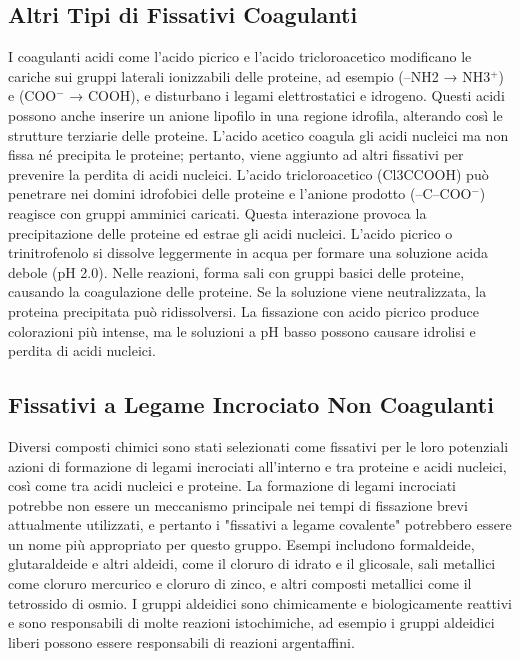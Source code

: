 \subsection{Altri Tipi di Fissativi Coagulanti}
I coagulanti acidi come l'acido picrico e l'acido tricloroacetico modificano le cariche sui gruppi laterali ionizzabili delle proteine, ad esempio (–NH2 → NH3\(^+\)) e (COO\(^{-}\) → COOH), e disturbano i legami elettrostatici e idrogeno. Questi acidi possono anche inserire un anione lipofilo in una regione idrofila, alterando così le strutture terziarie delle proteine. L'acido acetico coagula gli acidi nucleici ma non fissa né precipita le proteine; pertanto, viene aggiunto ad altri fissativi per prevenire la perdita di acidi nucleici. L'acido tricloroacetico (Cl3CCOOH) può penetrare nei domini idrofobici delle proteine e l'anione prodotto (–C–COO\(^{-}\)) reagisce con gruppi amminici caricati. Questa interazione provoca la precipitazione delle proteine ed estrae gli acidi nucleici. L'acido picrico o trinitrofenolo si dissolve leggermente in acqua per formare una soluzione acida debole (pH 2.0). Nelle reazioni, forma sali con gruppi basici delle proteine, causando la coagulazione delle proteine. Se la soluzione viene neutralizzata, la proteina precipitata può ridissolversi. La fissazione con acido picrico produce colorazioni più intense, ma le soluzioni a pH basso possono causare idrolisi e perdita di acidi nucleici.

\subsection{Fissativi a Legame Incrociato Non Coagulanti}
Diversi composti chimici sono stati selezionati come fissativi per le loro potenziali azioni di formazione di legami incrociati all'interno e tra proteine e acidi nucleici, così come tra acidi nucleici e proteine. La formazione di legami incrociati potrebbe non essere un meccanismo principale nei tempi di fissazione brevi attualmente utilizzati, e pertanto i "fissativi a legame covalente" potrebbero essere un nome più appropriato per questo gruppo. Esempi includono formaldeide, glutaraldeide e altri aldeidi, come il cloruro di idrato e il glicosale, sali metallici come cloruro mercurico e cloruro di zinco, e altri composti metallici come il tetrossido di osmio. I gruppi aldeidici sono chimicamente e biologicamente reattivi e sono responsabili di molte reazioni istochimiche, ad esempio i gruppi aldeidici liberi possono essere responsabili di reazioni argentaffini.

